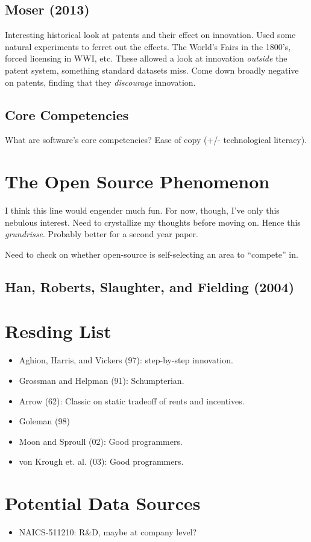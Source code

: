 \documentclass[11pt]{article}
\begin{document}
\subsection{Moser (2013)}
\label{sub:moser_}

  Interesting historical look at patents and their effect on innovation.  Used some natural experiments to ferret out the effects.  The World's Fairs in the 1800's, forced licensing in WWI, etc.  These allowed a look at innovation \emph{outside} the patent system, something standard datasets miss.  Come down broadly negative on patents, finding that they \emph{discourage} innovation.

\subsection{Core Competencies}
\label{sub:core_competencies}
  What are software's core competencies?  Ease of copy (+/- technological literacy).



\section{The Open Source Phenomenon}
\label{sec:the_open_source_phenomenon}

I think this line would engender much fun.  For now, though, I've only this nebulous interest.  Need to crystallize my thoughts before moving on.  Hence this \emph{grundrisse}.  Probably better for a second year paper.

Need to check on whether open-source is self-selecting an area to ``compete'' in.

\subsection{Han, Roberts, Slaughter, and Fielding (2004)}
\label{sub:han_roberts_slaughter_and_fielding_}

  

\section{Resding List}
\label{sec:resding_list}

\begin{itemize}
    \item Aghion, Harris, and Vickers (97): step-by-step innovation.
    \item Grossman and Helpman (91): Schumpterian.
    \item Arrow (62): Classic on static tradeoff of rents and incentives.
    \item Goleman (98)
    \item Moon and Sproull (02): Good programmers.
    \item von Krough et. al. (03): Good programmers.
\end{itemize}

\section{Potential Data Sources}
\label{sec:potential_data_sources}

\begin{itemize}
    \item NAICS-511210: R\&D, maybe at company level?
\end{itemize}
\end{document}
